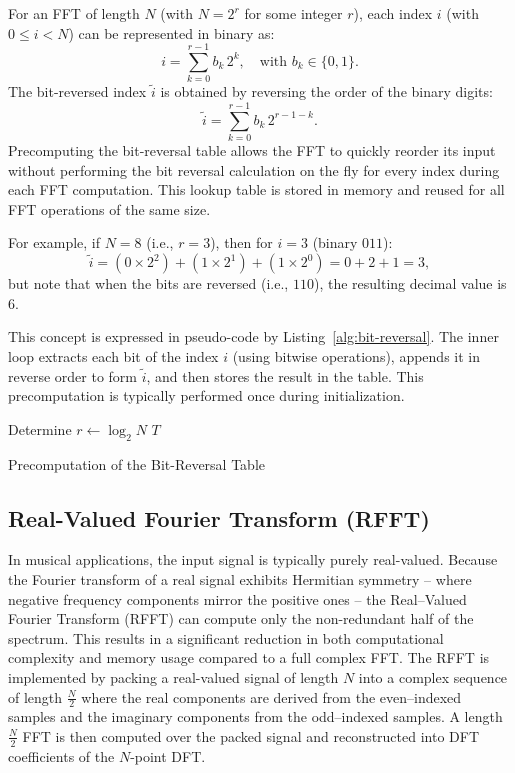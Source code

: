 \documentclass[12pt,letter]{article}
\begin{document}
For an FFT of length $N$ (with $N = 2^r$ for some integer $r$),
each index $i$ (with $0 \leq i < N$) can be represented in binary as:
$$
i = \sum_{k=0}^{r-1} b_k \, 2^k, \quad \text{with } b_k \in \{0,1\}.
$$
The bit-reversed index $\tilde{i}$ is obtained by reversing the order of
the binary digits:
$$
\tilde{i} = \sum_{k=0}^{r-1} b_k \, 2^{r-1-k}.
$$
Precomputing the bit-reversal table allows the FFT to quickly reorder its
input without performing the bit reversal calculation on the fly for every
index during each FFT computation. This lookup table is stored in memory and
reused for all FFT operations of the same size.

For example, if $N = 8$ (i.e., $r = 3$), then for $i = 3$
(binary $011$):
$$
\tilde{i} = (0 \times 2^2) + (1 \times 2^1) + (1 \times 2^0) = 0 + 2 + 1 = 3,
$$
but note that when the bits are reversed (i.e., $110$), the resulting
decimal value is 6.

This concept is expressed in pseudo-code by Listing~\ref{alg:bit-reversal}.
The inner loop extracts each bit of the index $i$ (using bitwise
operations), appends it in reverse order to form $\tilde{i}$, and then
stores the result in the table. This precomputation is typically performed
once during initialization.

\begin{algorithm}[H]
\SetAlgoLined
{}
Determine $r \gets \log_2 N$\;
\Return $T$\;
\caption{Precomputation of the Bit-Reversal Table}
\label{alg:bit-reversal}
\end{algorithm}

\subsection{Real-Valued Fourier Transform (RFFT)}

In musical applications, the input signal is typically purely real-valued.
Because the Fourier transform of a real signal exhibits Hermitian
symmetry -- where negative frequency components mirror the positive ones --
the Real--Valued Fourier Transform (RFFT) can compute only the non-redundant
half of the spectrum. This results in a significant reduction in both
computational complexity and memory usage compared to a full complex FFT. The
RFFT is implemented by packing a real-valued signal of length $N$ into a
complex sequence of length $\frac{N}{2}$ where the real components are
derived from the even--indexed samples and the imaginary components from the
odd--indexed samples. A length $\frac{N}{2}$ FFT is then computed over the
packed signal and reconstructed into DFT coefficients of the $N$-point DFT.
\end{document}
